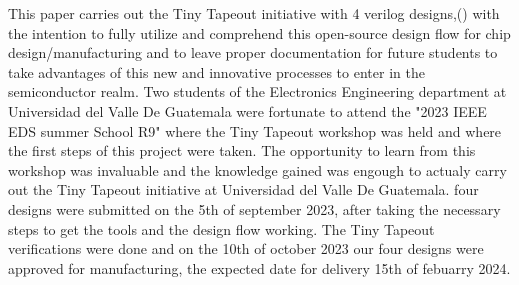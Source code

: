 This paper carries out the Tiny Tapeout initiative with 4 verilog designs,() 
with the intention to fully utilize and comprehend this open-source design 
flow for chip design/manufacturing and to leave proper documentation for future 
students to take advantages of this new and innovative processes to enter in the 
semiconductor realm.
Two students of the Electronics Engineering department at Universidad del Valle De Guatemala were 
fortunate to attend the "2023 IEEE EDS summer School R9" where the Tiny Tapeout workshop was held and 
where the first steps of this project were taken. The opportunity to learn from this 
workshop was invaluable and the knowledge gained was engough to actualy carry out the Tiny Tapeout
initiative at Universidad del Valle De Guatemala.
four designs were submitted on the 5th of september 2023, after taking the necessary steps to get the tools and the 
design flow working. The Tiny Tapeout verifications were done and on the 10th of october 2023 our four designs were approved for 
manufacturing, the expected date for delivery 15th of febuarry 2024. 
